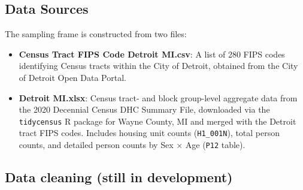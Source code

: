 \documentclass[
  12pt]{article}
\begin{document}
\subsection{Data Sources}\label{data-sources}

The sampling frame is constructed from two files:

\begin{itemize}
\item
  \textbf{Census Tract FIPS Code Detroit MI.csv}: A list of 280 FIPS
  codes identifying Census tracts within the City of Detroit, obtained
  from the City of Detroit Open Data Portal.
\item
  \textbf{Detroit MI.xlsx}: Census tract- and block group-level
  aggregate data from the 2020 Decennial Census DHC Summary File,
  downloaded via the \texttt{tidycensus} R package for Wayne County, MI
  and merged with the Detroit tract FIPS codes. Includes housing unit
  counts (\texttt{H1\_001N}), total person counts, and detailed person
  counts by Sex \(\times\) Age (\texttt{P12} table).
\end{itemize}

\subsection{Data cleaning (still in
development)}\label{data-cleaning-still-in-development}
\end{document}

